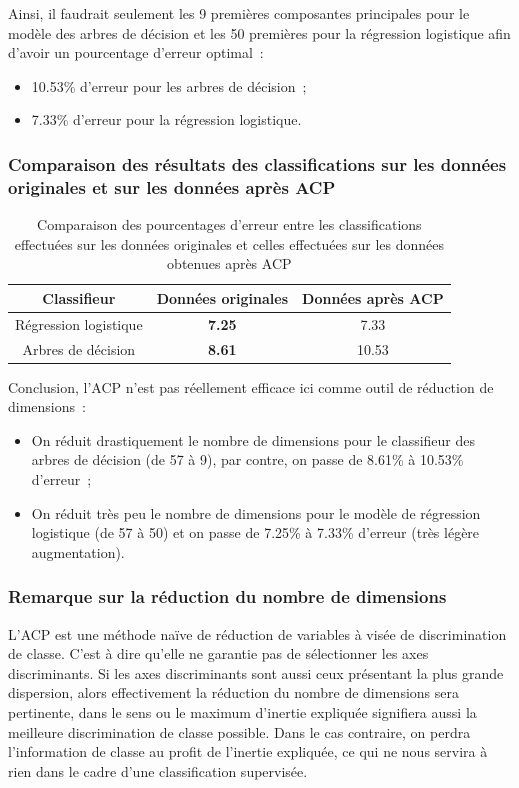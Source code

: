 \documentclass[a4paper,10pt]{report}
\begin{document}
Ainsi, il faudrait seulement les 9 premières composantes principales pour le modèle des arbres de décision et les 50 premières pour la régression logistique afin d'avoir un pourcentage d'erreur optimal~:
\begin{itemize}
	\item 10.53\% d'erreur pour les arbres de décision~;
	\item 7.33\% d'erreur pour la régression logistique.
\end{itemize}


\subsubsection{Comparaison des résultats des classifications sur les données originales et sur les données après ACP}
\begin{table}[H]
	\centering
	\captionsetup{justification=centering, margin=2cm}
	\begin{tabular}{c|c|c}
		Classifieur & Données originales & Données après ACP \\ 
		\hline
		Régression logistique & \textbf{7.25} & 7.33 \\ 
		Arbres de décision& \textbf{8.61} & 10.53 \\ 
	\end{tabular}
	\caption{\small Comparaison des pourcentages d'erreur entre les classifications effectuées sur les données originales et celles effectuées sur les données obtenues après ACP}
	\label{table:3-3-ACP-scale-center-spam-comparaison-taux-erreur-avant-apres-ACP}
\end{table}


Conclusion, l'ACP n'est pas réellement efficace ici comme outil de réduction de dimensions~:
\begin{itemize}
	\item On réduit drastiquement le nombre de dimensions pour le classifieur des arbres de décision (de 57 à 9), par contre, on passe de 8.61\% à 10.53\% d'erreur~;
	\item On réduit très peu le nombre de dimensions pour le modèle de régression logistique (de 57 à 50) et on passe de 7.25\% à 7.33\% d'erreur (très légère augmentation).
\end{itemize}



\subsubsection{Remarque sur la réduction du nombre de dimensions}
L'ACP est une méthode naïve de réduction de variables à visée de discrimination de classe. C'est à dire qu'elle ne garantie pas de sélectionner les axes discriminants. Si les axes discriminants sont aussi ceux présentant la plus grande dispersion, alors effectivement la réduction du nombre de dimensions sera pertinente, dans le sens ou le maximum d'inertie expliquée signifiera aussi la meilleure discrimination de classe possible. Dans le cas contraire, on perdra l'information de classe au profit de l'inertie expliquée, ce qui ne nous servira à rien dans le cadre d'une classification supervisée.
\end{document}
